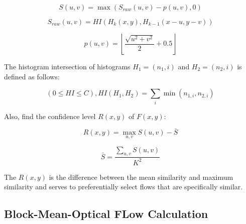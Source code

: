 \begin{equation}
  \label{equ:similarity}
  S(u,v) = \max(S_{raw}(u,v)-p(u,v),0)
\end{equation}

\begin{equation}
  \label{equ:similarity2}
  S_{raw}(u,v) = HI(H_k(x,y),H_{k-1}(x-u,y-v))
\end{equation}

\begin{equation}
  \label{equ:similarity3}
  p(u,v)=\left\lfloor \frac{\sqrt{u^2+v^2}}{2} + 0.5 \right\rfloor
\end{equation}


The histogram intersection of histograms $H_1=(n_1,i)$ and $H_2=(n_2,i)$ is defined as follows:

\begin{equation}
  \label{equ:hist_intersection}
  (0 \leq HI \leq C),HI(H_1,H_2)=\sum_{i} \min(n_{1,i},n_{2,i}) 
\end{equation}


Also, find the confidence level $R(x,y)$ of $F(x,y)$:

\begin{equation}
  \label{equ:confidence}
  R(x,y) =  \max_{u,v} S(u,v) - \bar{S} 
\end{equation}

\begin{equation}
  \label{equ:mean_similarity}
  \bar{S} = \frac{\sum_{u,v}S(u,v)}{K^2}
\end{equation}


The $R(x,y)$ is the difference between the mean similarity and maximum similarity and serves to preferentially select flows that are specifically similar.


\subsection{Block-Mean-Optical FLow Calculation}\label{subsection:block-optical}




